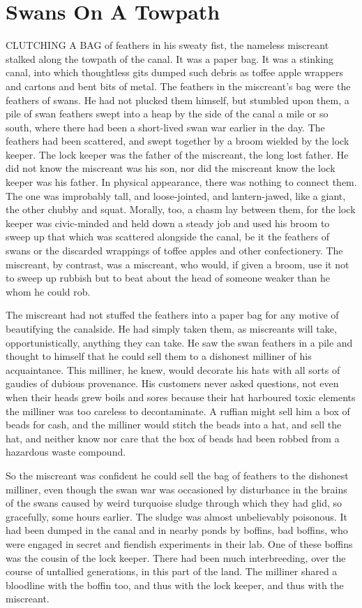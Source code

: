\chapter{Swans On A Towpath}

CLUTCHING A BAG of feathers in his sweaty fist, the nameless miscreant stalked along the towpath of the canal. It was a paper bag. It was a stinking canal, into which thoughtless gits dumped such debris as toffee apple wrappers and cartons and bent bits of metal. The feathers in the miscreant's bag were the feathers of swans. He had not plucked them himself, but stumbled upon them, a pile of swan feathers swept into a heap by the side of the canal a mile or so south, where there had been a short-lived swan war earlier in the day. The feathers had been scattered, and swept together by a broom wielded by the lock keeper. The lock keeper was the father of the miscreant, the long lost father. He did not know the miscreant was his son, nor did the miscreant know the lock keeper was his father. In physical appearance, there was nothing to connect them. The one was improbably tall, and loose-jointed, and lantern-jawed, like a giant, the other chubby and squat. Morally, too, a chasm lay between them, for the lock keeper was civic-minded and held down a steady job and used his broom to sweep up that which was scattered alongside the canal, be it the feathers of swans or the discarded wrappings of toffee apples and other confectionery. The miscreant, by contrast, was a miscreant, who would, if given a broom, use it not to sweep up rubbish but to beat about the head of someone weaker than he whom he could rob.

The miscreant had not stuffed the feathers into a paper bag for any motive of beautifying the canalside. He had simply taken them, as miscreants will take, opportunistically, anything they can take. He saw the swan feathers in a pile and thought to himself that he could sell them to a dishonest milliner of his acquaintance. This milliner, he knew, would decorate his hats with all sorts of gaudies of dubious provenance. His customers never asked questions, not even when their heads grew boils and sores because their hat harboured toxic elements the milliner was too careless to decontaminate. A ruffian might sell him a box of beads for cash, and the milliner would stitch the beads into a hat, and sell the hat, and neither know nor care that the box of beads had been robbed from a hazardous waste compound.

So the miscreant was confident he could sell the bag of feathers to the dishonest milliner, even though the swan war was occasioned by disturbance in the brains of the swans caused by weird turquoise sludge through which they had glid, so gracefully, some hours earlier. The sludge was almost unbelievably poisonous. It had been dumped in the canal and in nearby ponds by boffins, bad boffins, who were engaged in secret and fiendish experiments in their lab. One of these boffins was the cousin of the lock keeper. There had been much interbreeding, over the course of untallied generations, in this part of the land. The milliner shared a bloodline with the boffin too, and thus with the lock keeper, and thus with the miscreant.

